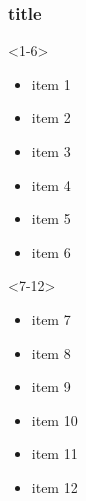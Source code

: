 \documentclass{beamer}
\begin{document}
\begin{frame}
\frametitle{title}

\begin{onlyenv}<1-6>
    \begin{itemize}[<+->]
        \item item 1
        \item item 2
        \item item 3
        \item item 4
        \item item 5
        \item item 6
    \end{itemize}
\end{onlyenv}

\begin{onlyenv}<7-12>
    \begin{itemize}[<+->]
        \item item 7
        \item item 8
        \item item 9
        \item item 10
        \item item 11
        \item item 12
    \end{itemize}
\end{onlyenv}

\end{frame} 
\end{document}
